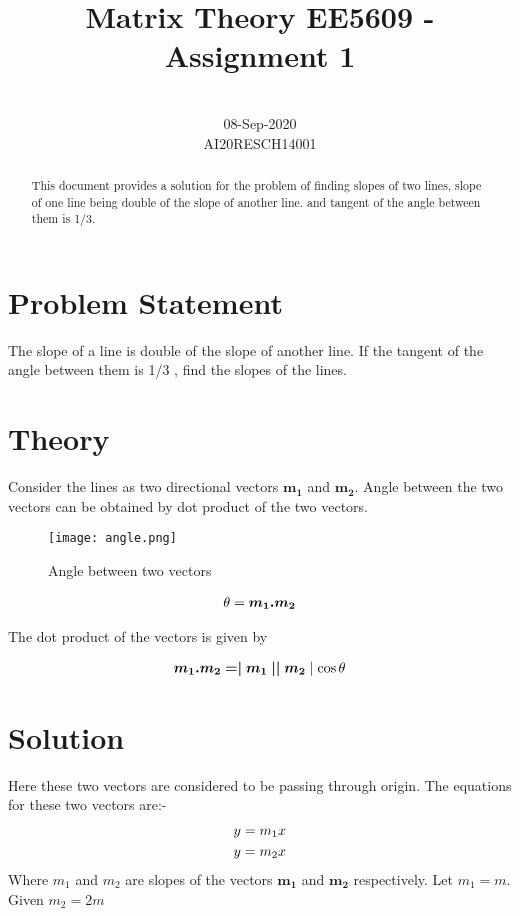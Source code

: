 \documentclass[conference]{IEEEtran}
\begin{document}
\title{Matrix Theory EE5609 - Assignment 1\\ 
}

\author{
 \\
08-Sep-2020\\
AI20RESCH14001\\
 }

\maketitle

\begin{abstract}
This document provides a solution for the problem of finding slopes of two lines,  slope of one line being double of the slope of another line. and tangent of the angle between them is 1/3.
\end{abstract}

\section{Problem Statement}
The slope of a line is double of the slope of another line. If the tangent of the angle between them is 1/3 , find the slopes of the lines.
\section{Theory}

Consider the lines as two directional vectors $\bm{m_{1}}$  and    $\bm{m_{2}}$. Angle between the two vectors can be obtained by dot product of the two vectors.
\begin{figure}[h!]
\centering
\texttt{[image: angle.png]}
\caption{Angle between two vectors}
\end{figure}

\begin{align}\notag
\theta = \bm{m_{1}  .  m_{2}}
\end{align}

The dot product of the vectors is given by

\begin{align}\notag
 \bm{m_{1}  .  m_{2} = \mid m_{1}\mid \mid m_{2}}\mid \cos \theta
\end{align}


\section{Solution}
Here these two vectors are considered to be passing through origin. The equations for these two vectors are:-
\begin{align}\notag
 y &= m_{1}x\\ \notag
 y &= m_{2}x
\end{align}
Where  $m_{1}$   and  $ m_{2}$ are slopes of the vectors $\bm{m_{1}}$   and    $\bm{m_{2}}$ respectively.
Let  $m_{1} = m$. Given  $m_{2} = 2m$
\end{document}
